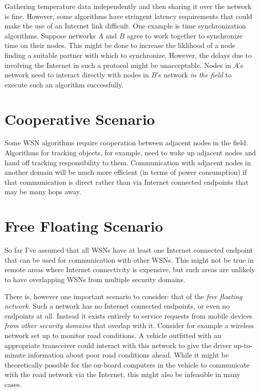 \documentclass{article}
\begin{document}
Gathering temperature data independently and then sharing it over the network is fine. However,
some algorithms have stringent latency requirements that could make the use of an Internet link
difficult. One example is time synchronization algorithms. Suppose networks $A$ and $B$ agree to
work together to synchronize time on their nodes. This might be done to increase the liklihood
of a node finding a suitable partner with which to synchronize. However, the delays due to
involving the Internet in such a protocol might be unacceptable. Nodes in $A$'s network need to
interact directly with nodes in $B$'s network \emph{in the field} to execute such an algorithm
successfully.


\section{Cooperative Scenario}

Some WSN algorithms require cooperation between adjacent nodes in the field. Algorithms for
tracking objects, for example, need to wake up adjacent nodes and hand off tracking
responsibility to them. Communication with adjacent nodes in another domain will be much more
efficient (in terms of power consumption) if that communication is direct rather than via
Internet connected endpoints that may be many hops away.


\section{Free Floating Scenario}

So far I've assumed that all WSNs have at least one Internet connected endpoint that can be used
for communication with other WSNs. This might not be true in remote areas where Internet
connectivity is expensive, but such areas are unlikely to have overlapping WSNs from multiple
security domains.

There is, however one important scenario to consider: that of the \emph{free floating network}.
Such a network has no Internet connected endpoints, or even no endpoints at all. Instead it
exists entirely to service requests from mobile devices \emph{from other security domains} that
overlap with it. Consider for example a wireless network set up to monitor road conditions. A
vehicle outfitted with an appropriate transceiver could interact with this network to give the
driver up-to-minute information about poor road conditions ahead. While it might be
theoretically possible for the on-board computers in the vehicle to communicate with the road
network via the Internet, this might also be infeasible in many cases.
\end{document}
